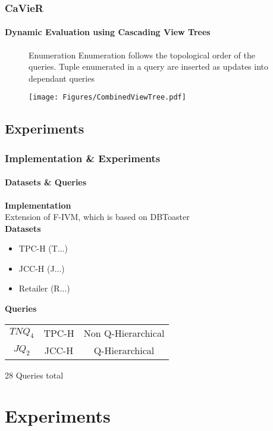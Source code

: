 \documentclass[
	11pt, %
]{beamer}
\begin{document}
\begin{frame}
	\frametitle{CaVieR}
	\framesubtitle{Dynamic Evaluation using Cascading View Trees}
	\begin{figure}
		\begin{minipage}{0.5\textwidth}
		\begin{block}{Enumeration}
			Enumeration follows the topological order of the queries. Tuple enumerated in a query are inserted as updates into dependant queries
		\end{block}
		\end{minipage}
		\begin{minipage}{0.49\textwidth}
			\vspace{-0.8cm}
			\texttt{[image: Figures/CombinedViewTree.pdf]}
		\end{minipage}
	\end{figure}
\end{frame}

\subsection{Experiments}
\begin{frame}
	\frametitle{Implementation \& Experiments}
	\framesubtitle{Datasets \& Queries}
	\textbf{Implementation}\\
	Extension of F-IVM, which is based on DBToaster\\
	\vspace{0.1cm}
	\textbf{Datasets}
	\begin{itemize}
		\item TPC-H	  (T...)
		\item JCC-H   (J...)
		\item Retailer  (R...)
	\end{itemize}
	\vspace{1em}
	\textbf{Queries}\\
	\vspace{0.5em}
	\begin{tabular}{c|c|c}
		$TNQ_4$ & TPC-H & Non Q-Hierarchical \\
		\addlinespace[0.5em]
		\hline
		\addlinespace[0.5em]
		$JQ_2$ & JCC-H & Q-Hierarchical \\
	\end{tabular}
	
	\vspace{1em}
	28 Queries total
\end{frame}

\section{Experiments}
\end{document}
